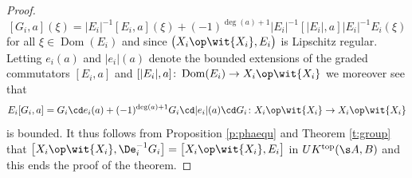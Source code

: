 \begin{proof}
\[
[G_i,a](\xi) = |E_i|^{-1} [E_i,a](\xi) + (-1)^{\deg (a) + 1} |E_i|^{-1}[|E_i|, a] |E_i|^{-1} E_i(\xi)
\]
for all $\xi \in \operatorname{Dom}(E_i)$ and since $\big(X_i \op \wit{X_i}, E_i\big)$ is Lipschitz regular. Letting $e_i(a)$ and $|e_i|(a)$ denote the bounded extensions of the graded commutators $[E_i,a]$ and $[|E_i|,a]\colon \operatorname{Dom}(E_i) \to X_i \op \wit{X_i}$ we moreover see that
\[
E_i [G_i,a] = G_i \cd e_i(a) + (-1)^{\deg (a) + 1} G_i \cd |e_i|(a) \cd G_i\colon X_i \op \wit{X_i} \to X_i \op \wit{X_i}
\]
is bounded. It thus follows from Proposition \ref{p:phaequ} and Theorem \ref{t:group} that $\big[X_i \op \wit{X_i}, \De_i^{-1} G_i\big] = \big[X_i \op \wit{X_i}, E_i\big]$ in $UK^{{\rm top}}(\s A,B)$ and this ends the proof of the theorem.
\end{proof}

